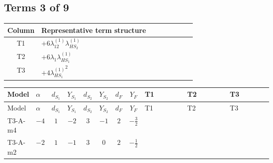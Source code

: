 \documentclass[8pt]{article}
\begin{document}
\begin{landscape}
\subsection*{Terms 3 of 9}
\begin{center}
\begin{tabular}{@{}c >{\raggedright\arraybackslash}p{0.82\linewidth}@{}}
\toprule
Column & Representative term structure \\
\midrule
T1 & \(\displaystyle +6 {\lambda_{12}^{(1)}} {\lambda_{HS_2}^{(1)}}\) \\
\midrule
T2 & \(\displaystyle +6 {\lambda_1} {\lambda_{HS_1}^{(1)}}\) \\
\midrule
T3 & \(\displaystyle +4 {\lambda_{HS_1}^{(1)}}^2\) \\
\midrule
\bottomrule
\end{tabular}
\end{center}
\smallskip
\tiny
\begin{longtable}{@{}llcccccc >{\raggedright\arraybackslash}p{0.21\linewidth} >{\raggedright\arraybackslash}p{0.21\linewidth} >{\raggedright\arraybackslash}p{0.21\linewidth}@{}}
\toprule
Model & $\alpha$ & $d_{S_1}$ & $Y_{S_1}$ & $d_{S_2}$ & $Y_{S_2}$ & $d_F$ & $Y_F$ & T1 & T2 & T3 \\
\midrule
\endfirsthead
\toprule
Model & $\alpha$ & $d_{S_1}$ & $Y_{S_1}$ & $d_{S_2}$ & $Y_{S_2}$ & $d_F$ & $Y_F$ & T1 & T2 & T3 \\
\midrule
\endhead
T3-A-m4 & $-4$ & $1$ & $-2$ & $3$ & $-1$ & $2$ & $-\frac{3}{2}$ & \scriptsize\adjustbox{max width=\linewidth}{$\begin{gathered} +6 {\lambda_{12}^{(1)}} {\lambda_{HS_2}^{(1)}}\end{gathered}$} & \scriptsize\adjustbox{max width=\linewidth}{$\begin{gathered} +6 {\lambda_1} {\lambda_{HS_1}^{(1)}}\end{gathered}$} & \scriptsize\adjustbox{max width=\linewidth}{$\begin{gathered} +4 {\lambda_{HS_1}^{(1)}}^2\end{gathered}$} \\
\midrule
T3-A-m2 & $-2$ & $1$ & $-1$ & $3$ & $0$ & $2$ & $-\frac{1}{2}$ & \scriptsize\adjustbox{max width=\linewidth}{$\begin{gathered} +6 {\lambda_{12}^{(1)}} {\lambda_{HS_2}^{(1)}}\end{gathered}$} & \scriptsize\adjustbox{max width=\linewidth}{$\begin{gathered} +6 {\lambda_1} {\lambda_{HS_1}^{(1)}}\end{gathered}$} & \scriptsize\adjustbox{max width=\linewidth}{$\begin{gathered} +4 {\lambda_{HS_1}^{(1)}}^2\end{gathered}$} \\

\end{longtable}
\end{landscape}
\end{document}
